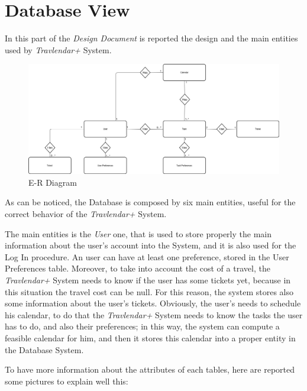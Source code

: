 \section{Database View}
In this part of the \emph{Design Document} is reported the design and the main entities used by \emph{Travlendar+} System.

\begin{figure}[H]
    \centering
    \includegraphics[scale=0.27]{Pictures/DatabaseDiagrams/E-R_Diagram.png}
    \caption{E-R Diagram}
\end{figure}

As can be noticed, the Database is composed by six main entities, useful for the correct behavior of the \emph{Travlendar+} System.

The main entities is the \emph{User} one, that is used to store properly the main information about the user's account into the System, and it is also used for the Log In procedure. An user can have at least one preference, stored in the User Preferences table.
Moreover, to take into account the cost of a travel, the \emph{Travlendar+} System needs to know if the user has some tickets yet, because in this situation the travel cost can be null. For this reason, the system stores also some information about the user's tickets.
Obviously, the user's needs to schedule his calendar, to do that the \emph{Travlendar+} System needs to know the tasks the user has to do, and also their preferences; in this way, the system can compute a feasible calendar for him, and then it stores this calendar into a proper entity in the Database System.

To have more information about the attributes of each tables, here are reported some pictures to explain well this:

